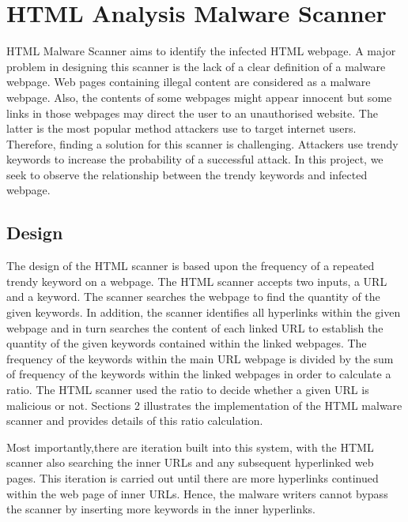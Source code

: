 \section{HTML Analysis Malware Scanner}

HTML Malware Scanner aims to identify the infected HTML webpage. A major problem in designing this scanner is the lack of a clear definition of a malware webpage. Web pages containing illegal content are considered as a malware webpage. Also, the contents of some webpages might appear innocent but some links in those webpages may direct the user to an unauthorised website. The latter is the most popular method attackers use to target internet users. Therefore, finding a solution for this scanner is challenging. Attackers use trendy keywords to increase the probability of a successful attack. In this project, we seek to observe the relationship between the trendy keywords and infected webpage.

\subsection{Design}

The design of the HTML scanner is based upon the frequency of a repeated trendy keyword on a webpage. The HTML scanner accepts two inputs, a URL and a keyword. The scanner searches the webpage to find the quantity of the given keywords. In addition, the scanner identifies all hyperlinks within the given webpage and in turn searches the content of each linked URL to establish the quantity of the given keywords contained within the linked webpages. The frequency of the keywords within the main URL webpage is divided by the sum of frequency of the keywords within the linked webpages in order to calculate a ratio. The HTML scanner used the ratio to decide whether a given URL is malicious or not. Sections 2 illustrates the implementation of the HTML malware scanner and provides details of this ratio calculation.

Most importantly,there are iteration built into this system, with the HTML scanner also searching the inner URLs and any subsequent hyperlinked web pages. This iteration is carried out until there are more hyperlinks continued within the web page of inner URLs. Hence, the malware writers cannot bypass the scanner by inserting more keywords in the inner hyperlinks. 

